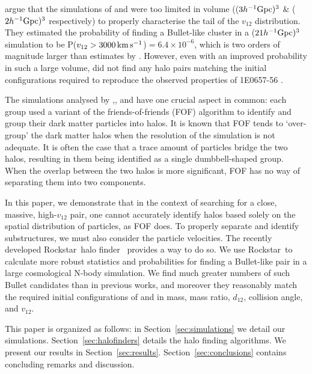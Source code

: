 \documentclass[useAMS, usenatbib]{mn2e}
\newcommand{\hinv}{h^{-1}}
\newcommand{\vonetwo}{v_{12}}
\newcommand{\kms}{\,\rm{km}\,\rm{s}^{-1}}
\newcommand{\RS}{{\sc Rockstar}}
\begin{document}
\citet{Bouillot14} argue that the simulations of \citet{Lee10} and \citet{Thompson12}
were too limited in volume (($3\hinv\rm{Gpc})^3$ \& ($2\hinv\rm{Gpc})^3$
respectively) to properly characterise the tail of the $\vonetwo$ distribution.
They estimated the probability of finding a Bullet-like cluster in
a ($21\hinv\rm{Gpc})^3$ simulation to be
P($\vonetwo>3000\kms$)$=6.4\times10^{-6}$, which is two orders of
magnitude larger than estimates by \citet{Thompson12}.  However,
even with an improved probability in such a large volume,
\citet{Bouillot14} did not find any halo pairs matching the initial
configurations required to reproduce the observed properties of
1E0657-56 \citep{Mast08,Lage14b} .

The simulations analysed by \citet{Lee10},\citet{Thompson12}, and \citet{Bouillot14}
have one crucial aspect in common: each group used a variant of the
friends-of-friends (FOF) algorithm \citep[e.g.,][]{Davis85} to identify and
group their dark matter particles into halos.  It is known that FOF
tends to `over-group' the dark matter halos when the resolution of
the simulation is not adequate.  It is often the case that a trace
amount of particles bridge the two halos, resulting in them being
identified as a single dumbbell-shaped group.  When the overlap between
the two halos is more significant, FOF has no way of separating
them into two components.  

In this paper, we demonstrate that in the context of searching for
a close, massive, high-$\vonetwo$ pair, one cannot accurately identify halos
based solely on the spatial distribution of particles, as FOF does.
To properly separate and identify substructures, we must also
consider the particle velocities.  The recently developed \RS\
halo finder~\citep{ROCKSTAR} provides a way to do so.  We use
\RS\ to calculate more robust statistics and probabilities for
finding a Bullet-like pair in a large cosmological N-body simulation.
We find much greater numbers of such Bullet candidates than in
previous works, and moreover they reasonably match the required
initial configurations of \citet{Mast08} and \citet{Lage14b} in mass, mass
ratio, $d_{12}$, collision angle, and $\vonetwo$.

This paper is organized as follows: in Section~\ref{sec:simulations}
we detail our simulations.  Section~\ref{sec:halofinders} details
the halo finding algorithms.  We present our results in
Section~\ref{sec:results}.   Section~\ref{sec:conclusions} contains
concluding remarks and discussion.
\end{document}
